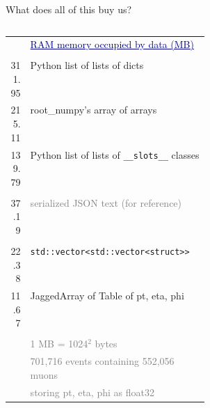 \documentclass[aspectratio=169]{beamer}
\begin{document}
\begin{frame}{What does all of this buy us?}
\vspace{0.5 cm}
\scriptsize

\begin{columns}
\begin{columns}
\begin{tabular}{r p{0.9\linewidth}}
& \textcolor{darkblue}{\small\underline{RAM memory occupied by data (MB)}} \\
& \\
311.95 & \textcolor{pythoncolor}{Python list of lists of dicts} \\
215.11 & \textcolor{rootnpcolor}{root\_numpy's array of arrays} \\
139.79 & \textcolor{pythoncolor}{Python list of lists of {\tt\scriptsize \_\_slots\_\_} classes} \\
& \\
 37.19 & \textcolor{gray}{serialized JSON text (for reference)} \\
& \\
 22.38 & \textcolor{cppcolor}{\tt\scriptsize std::vector<std::vector<struct>>} \\
 11.67 & \textcolor{mycolor}{JaggedArray of Table of pt, eta, phi} \\
& \\
& \textcolor{gray}{\scriptsize 1 MB = 1024$^2$ bytes} \\
& \textcolor{gray}{\scriptsize 701,716 events containing 552,056 muons} \\
& \textcolor{gray}{\scriptsize storing pt, eta, phi as float32} \\
\end{tabular}

\vspace{2.3 cm}


\end{columns}
\end{columns}
\end{frame}
\end{document}
